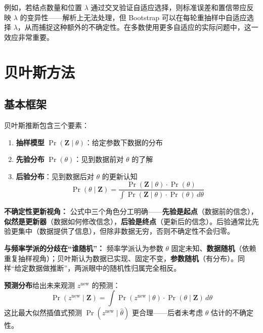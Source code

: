 例如，若结点数量和位置 $\lambda$ 通过交叉验证自适应选择，则标准误差和置信带应反映 $\lambda$ 的变异性——解析上无法处理，但 Bootstrap 可以在每轮重抽样中自适应选择 $\lambda$，从而捕捉这种额外的不确定性。在多数使用更多自适应的实际问题中，这一效应非常重要。

\section{贝叶斯方法}

\subsection{基本框架}

贝叶斯推断包含三个要素：

\begin{enumerate}
    \item \textbf{抽样模型} $\Pr(\mathbf{Z} \mid \theta)$：给定参数下数据的分布
    \item \textbf{先验分布} $\Pr(\theta)$：见到数据前对 $\theta$ 的了解
    \item \textbf{后验分布}：见到数据后对 $\theta$ 的更新认知
    \begin{equation}\label{eq:posterior}
        \Pr(\theta \mid \mathbf{Z}) = \frac{\Pr(\mathbf{Z} \mid \theta)\cdot\Pr(\theta)}{\int\Pr(\mathbf{Z} \mid \theta)\cdot\Pr(\theta)\,d\theta}
    \end{equation}
\end{enumerate}

\textbf{不确定性更新视角：} 公式中三个角色分工明确——\textbf{先验是起点}（数据前的信念），\textbf{似然是更新器}（数据如何修改信念），\textbf{后验是终点}（更新后的信念）。后验通常比先验更集中（数据提供了信息），但除非数据无穷，否则不确定性不会归零。

\textbf{与频率学派的分歧在“谁随机”：} 频率学派认为参数 $\theta$ 固定未知、\textbf{数据随机}（依赖重复抽样视角）；贝叶斯认为数据已实现、固定不变，\textbf{参数随机}（有分布）。同样“给定数据做推断”，两派眼中的随机性归属完全相反。

\textbf{预测分布}给出未来观测 $z^{\text{new}}$ 的预测：
\begin{equation}\label{eq:predictive}
    \Pr(z^{\text{new}} \mid \mathbf{Z}) = \int \Pr(z^{\text{new}} \mid \theta)\cdot\Pr(\theta \mid \mathbf{Z})\,d\theta
\end{equation}
这比最大似然插值式预测 $\Pr(z^{\text{new}} \mid \hat{\theta})$ 更合理——后者未考虑 $\theta$ 估计的不确定性。

